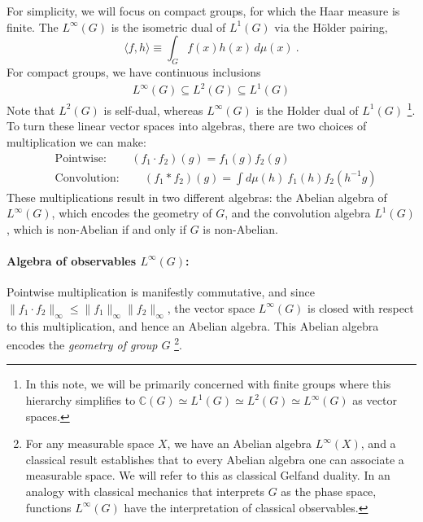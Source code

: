 \documentclass[11pt]{article}
\newcommand{\nn}{\nonumber}
\begin{document}
For simplicity, we will focus on compact groups, for which the Haar measure is finite. The $L^\infty(G)$ is the isometric dual of $L^1(G)$ via the Hölder pairing,
\begin{equation}
    \langle f, h \rangle \equiv \int_G f(x) h(x) \, d\mu(x)\ .
\end{equation}
For compact groups, we have continuous inclusions
\begin{align}\label{hierLp}
    L^\infty(G)\subseteq L^2(G)\subseteq L^1(G)
\end{align}
Note that $L^2(G)$ is self-dual, whereas $L^\infty(G)$ is the Holder dual of  $L^1(G)$ \footnote{In this note, we will be primarily concerned with finite groups where this hierarchy simplifies to $\mathbb{C}(G)\simeq L^1(G)\simeq L^2(G)\simeq L^\infty(G)$ as vector spaces.}.
To turn these linear vector spaces into algebras, there are two choices of multiplication we can make:
\begin{align}
    &\text{Pointwise}: \qquad (f_1\cdot f_2)(g)=f_1(g)f_2(g)\nn\\
    &\text{Convolution}:\qquad (f_1*f_2)(g)=\int d\mu(h) \: f_1(h)f_2(h^{-1}g)
\end{align}
These multiplications result in two different algebras: the Abelian algebra of $L^\infty(G)$, which encodes the geometry of $G$, and the convolution algebra $L^1(G)$, which is non-Abelian if and only if $G$ is non-Abelian. 

\paragraph{Algebra of observables $L^\infty(G)$:} Pointwise multiplication is manifestly commutative, and since $\|f_1\cdot f_2 \|_\infty\leq \|f_1\|_\infty\|f_2\|_\infty$, the vector space $L^\infty(G)$ is closed with respect to this multiplication, and hence an Abelian algebra. This Abelian algebra encodes the {\it geometry of group $G$} \footnote{For any measurable space $X$, we have an Abelian algebra $L^\infty(X)$, and a classical result establishes that to every Abelian algebra one can associate a measurable space. We will refer to this as classical Gelfand duality. In an analogy with classical mechanics that interprets $G$ as the phase space, functions $L^\infty(G)$ have the interpretation of classical observables.}. 
\end{document}
